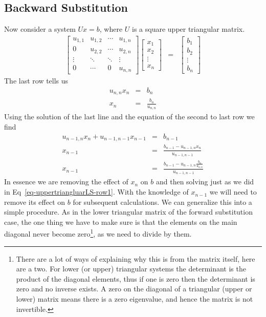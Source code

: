 \subsection{Backward Substitution}

Now consider a system $Ux=b$, where $U$ is a square upper triangular matrix.
\begin{eqnarray}
\left[\begin{matrix}
u_{1,1} & u_{1,2} & \cdots & u_{1,n} \\
0       & u_{2,2} & \cdots & u_{2,n} \\
\vdots  & \ddots  & \ddots & \vdots \\
0       & \cdots  & 0      & u_{n,n}
\end{matrix}\right]
\left[\begin{matrix}
x_1 \\
x_2 \\
\vdots \\
x_n
\end{matrix}\right]
&=&
\left[\begin{matrix}
b_1 \\
b_2 \\
\vdots \\
b_n
\end{matrix}\right] \label{eq-uppertriangluarLS}
\end{eqnarray}
The last row tells us
\begin{eqnarray}
u_{n,n}x_n &=& b_n \nonumber \\
x_n &=& \frac{b_n}{u_{n,n}} \label{eq-uppertriangluarLS-row1}
\end{eqnarray}
Using the solution of the last line and the equation of the second to last row we find
\begin{eqnarray}
u_{n-1,n}x_n + u_{n-1,n-1}x_{n-1} &=& b_{n-1} \nonumber \\
x_{n-1} &=& \frac{b_{n-1}-u_{n-1,n}x_n}{u_{n-1,n-1}} \\
x_{n-1} &=& \frac{b_{n-1}-u_{n-1,n}\frac{b_n}{u_{n,n}}}{u_{n-1,n-1}} \nonumber
\end{eqnarray}
In essence we are removing the effect of $x_n$ on $b$ and then solving just as we did in Eq~\ref{eq-uppertriangluarLS-row1}.  With the knowledge of $x_{n-1}$ we will need to remove its effect on $b$ for subsequent calculations.  We can generalize this into a simple procedure.  As in the lower triangular matrix of the forward substitution case, the one thing we have to make sure is that the elements on the main diagonal never become zero\footnote{There are a lot of ways of explaining why this is from the matrix itself, here are a two.  For lower (or upper) triangular systems the determinant is the product of the diagonal elements, thus if one is zero then the determinant is zero and no inverse exists.  A zero on the diagonal of a triangular (upper or lower) matrix means there is a zero eigenvalue, and hence the matrix is not invertible.}, as we need to divide by them.

